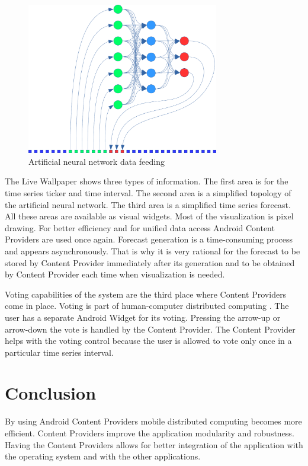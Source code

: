 \documentclass{ifacconf}
\begin{document}
\begin{figure}
\begin{center}
\includegraphics[width=8.4cm]{images/fig0005}
\caption{Artificial neural network data feeding} 
\label{fig0005}
\end{center}
\end{figure}

The Live Wallpaper shows three types of information. The first area is for the time series ticker and time interval.  The second area is a simplified topology of the artificial neural network. The third area is a simplified time series forecast. All these areas are available as visual widgets. Most of the visualization is pixel drawing. For better efficiency and for unified data access Android Content Providers are used once again. Forecast generation is a time-consuming process and appears asynchronously. That is why it is very rational for the forecast to be stored by Content Provider immediately after its generation and to be obtained by Content Provider each time when visualization is needed. 

Voting capabilities of the system are the third place where Content Providers come in place. Voting is part of human-computer distributed computing \cite{Tomov-2019-a}. The user has a separate Android Widget for its voting. Pressing the arrow-up or arrow-down the vote is handled by the Content Provider. The Content Provider helps with the voting control because the user is allowed to vote only once in a particular time series interval. 

\section{Conclusion}

By using Android Content Providers mobile distributed computing becomes more efficient. Content Providers improve the application modularity and robustness. Having the Content Providers allows for better integration of the application with the operating system and with the other applications. 
\end{document}
